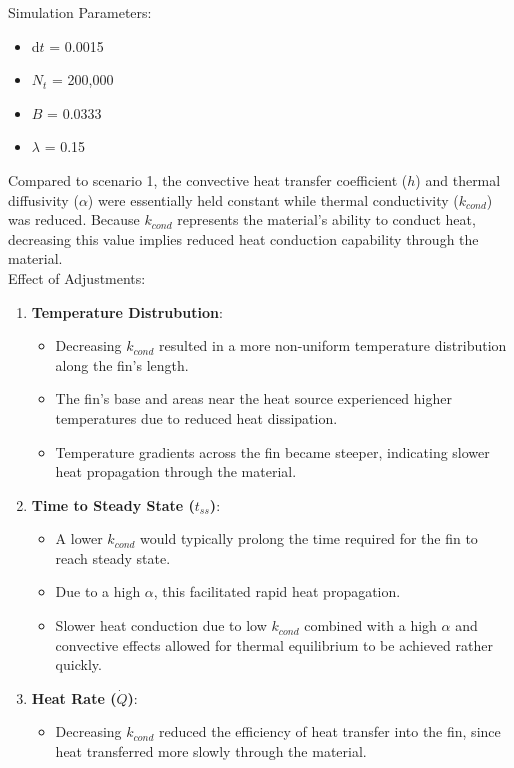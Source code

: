 \documentclass{article}
\begin{document}
Simulation Parameters:
\begin{itemize}
    \item d$t$ = 0.0015
    \item $N_t$ = 200,000
    \item $B$ = $\SI{0.0333}{}$
    \item $\lambda$ = 0.15
\end{itemize}

Compared to scenario 1, the convective heat transfer coefficient ($h$) and thermal diffusivity ($\alpha$) were essentially held constant while thermal conductivity ($k_{cond}$) was reduced. Because $k_{cond}$ represents the material's ability to conduct heat, decreasing this value implies reduced heat conduction capability through the material. \\

Effect of Adjustments:
\begin{enumerate}
    \item \textbf{Temperature Distrubution}:
        \begin{itemize}
            \item Decreasing $k_{cond}$ resulted in a more non-uniform temperature distribution along the fin's length.
            \item The fin's base and areas near the heat source experienced higher temperatures due to reduced heat dissipation.
            \item Temperature gradients across the fin became steeper, indicating slower heat propagation through the material.
        \end{itemize}
    \item \textbf{Time to Steady State ($t_{ss}$)}:
        \begin{itemize}
            \item A lower $k_{cond}$ would typically prolong the time required for the fin to reach steady state. 
            \item Due to a high $\alpha$, this facilitated rapid heat propagation.
            \item Slower heat conduction due to low $k_{cond}$ combined with a high $\alpha$ and convective effects allowed for thermal equilibrium to be achieved rather quickly.
        \end{itemize}
    \item \textbf{Heat Rate ($\dot{Q}$)}:
        \begin{itemize}
            \item Decreasing $k_{cond}$ reduced the efficiency of heat transfer into the fin, since heat transferred more slowly through the material.
        \end{itemize}
\end{enumerate}
\end{document}
